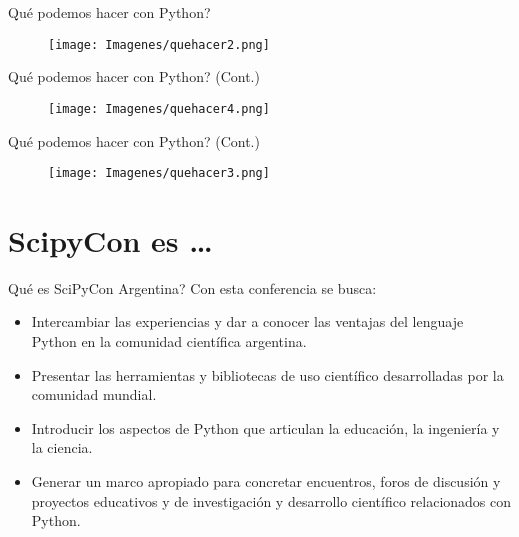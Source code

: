 \documentclass[xcolor=dvipsnames]{beamer}
\begin{document}
\begin{frame}{Qu\'e podemos hacer con Python?}

 \begin{figure}[h]
		\texttt{[image: Imagenes/quehacer2.png]}
\end{figure}
\end{frame}

\begin{frame}{Qu\'e podemos hacer con Python? (Cont.)}

 \begin{figure}[h]
		\texttt{[image: Imagenes/quehacer4.png]}
\end{figure}
\end{frame}



\begin{frame}{Qu\'e podemos hacer con Python? (Cont.)}

 \begin{figure}[h]
		\texttt{[image: Imagenes/quehacer3.png]}
\end{figure}
\end{frame}


\section{ScipyCon es \ldots}
\begin{frame}{Qu\'e es SciPyCon Argentina?}
Con esta conferencia se busca:
	\begin{itemize}
	\item Intercambiar las experiencias y dar a conocer las ventajas del lenguaje Python en la comunidad científica argentina.
	\item Presentar las herramientas y bibliotecas de uso científico desarrolladas por la comunidad mundial.
	\item Introducir los aspectos de Python que articulan la educación, la ingeniería y la ciencia.
	\item Generar un marco apropiado para concretar encuentros, foros de discusión y proyectos educativos y de investigación y desarrollo científico relacionados con Python.
\end{itemize}
\end{frame}
\end{document}
